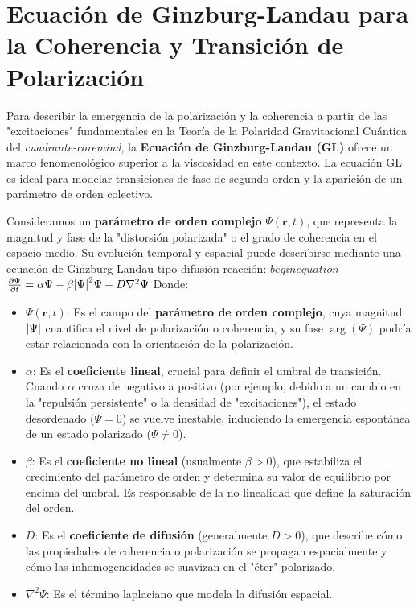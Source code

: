 \documentclass{book}
\begin{document}
\section*{Ecuación de Ginzburg-Landau para la Coherencia y Transición de Polarización}
\label{sec:ginzburg_landau}

Para describir la emergencia de la polarización y la coherencia a partir de las "excitaciones" fundamentales en la Teoría de la Polaridad Gravitacional Cuántica del \textit{cuadrante-coremind}, la \textbf{Ecuación de Ginzburg-Landau (GL)} ofrece un marco fenomenológico superior a la viscosidad en este contexto. La ecuación GL es ideal para modelar transiciones de fase de segundo orden y la aparición de un parámetro de orden colectivo.

Consideramos un \textbf{parámetro de orden complejo} $\Psi(\mathbf{r}, t)$, que representa la magnitud y fase de la "distorsión polarizada" o el grado de coherencia en el espacio-medio. Su evolución temporal y espacial puede describirse mediante una ecuación de Ginzburg-Landau tipo difusión-reacción:
$begin{equation}$$\pdv{\Psi}{t} = \alpha \Psi - \beta \abs{\Psi}^2 \Psi + D \nabla^2 \Psi
    \label{eq:ginzburg_landau}
\end{equation}$
Donde:
\begin{itemize}
    \item $\Psi(\mathbf{r}, t)$: Es el campo del \textbf{parámetro de orden complejo}, cuya magnitud $\abs{\Psi}$ cuantifica el nivel de polarización o coherencia, y su fase $\arg(\Psi)$ podría estar relacionada con la orientación de la polarización.
    \item $\alpha$: Es el \textbf{coeficiente lineal}, crucial para definir el umbral de transición. Cuando $\alpha$ cruza de negativo a positivo (por ejemplo, debido a un cambio en la "repulsión persistente" o la densidad de "excitaciones"), el estado desordenado ($\Psi=0$) se vuelve inestable, induciendo la emergencia espontánea de un estado polarizado ($\Psi \neq 0$).
    \item $\beta$: Es el \textbf{coeficiente no lineal} (usualmente $\beta > 0$), que estabiliza el crecimiento del parámetro de orden y determina su valor de equilibrio por encima del umbral. Es responsable de la no linealidad que define la saturación del orden.
    \item $D$: Es el \textbf{coeficiente de difusión} (generalmente $D > 0$), que describe cómo las propiedades de coherencia o polarización se propagan espacialmente y cómo las inhomogeneidades se suavizan en el "éter" polarizado.
    \item $\nabla^2 \Psi$: Es el término laplaciano que modela la difusión espacial.
\end{itemize}
\end{document}
